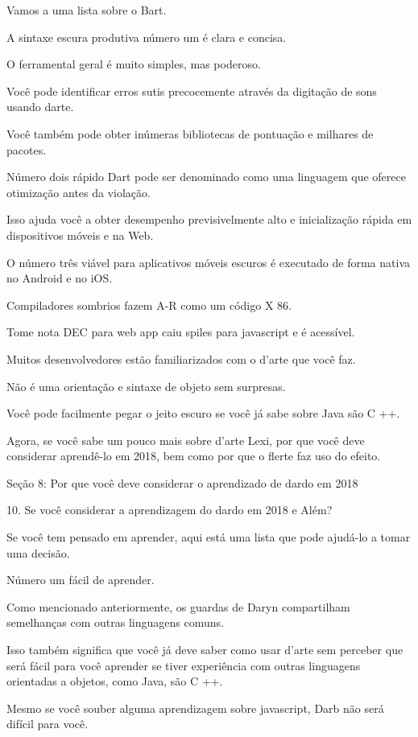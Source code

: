 Vamos a uma lista sobre o Bart.

A sintaxe escura produtiva número um é clara e concisa.

O ferramental geral é muito simples, mas poderoso.

Você pode identificar erros sutis precocemente através da digitação de sons usando darte.

Você também pode obter inúmeras bibliotecas de pontuação e milhares de pacotes.

Número dois rápido Dart pode ser denominado como uma linguagem que oferece otimização antes da violação.

Isso ajuda você a obter desempenho previsivelmente alto e inicialização rápida em dispositivos móveis e na Web.

O número três viável para aplicativos móveis escuros é executado de forma nativa no Android e no iOS.

Compiladores sombrios fazem A-R como um código X 86.

Tome nota DEC para web app caiu spiles para javascript e é acessível.

Muitos desenvolvedores estão familiarizados com o d'arte que você faz.

Não é uma orientação e sintaxe de objeto sem surpresas.

Você pode facilmente pegar o jeito escuro se você já sabe sobre Java são C ++.

Agora, se você sabe um pouco mais sobre d'arte Lexi, por que você deve considerar aprendê-lo em 2018, bem como por que o flerte faz uso do efeito.

Seção 8: Por que você deve considerar o aprendizado de dardo em
2018

10. Se você considerar a aprendizagem do dardo em 2018 e
Além?

Se você tem pensado em aprender, aqui está uma lista que pode ajudá-lo a tomar uma decisão.

Número um fácil de aprender.

Como mencionado anteriormente, os guardas de Daryn compartilham semelhanças com outras linguagens comuns.

Isso também significa que você já deve saber como usar d'arte sem perceber que será fácil para você aprender se tiver experiência com outras linguagens orientadas a objetos, como Java, são C ++.

Mesmo se você souber alguma aprendizagem sobre javascript, Darb não será difícil para você.

